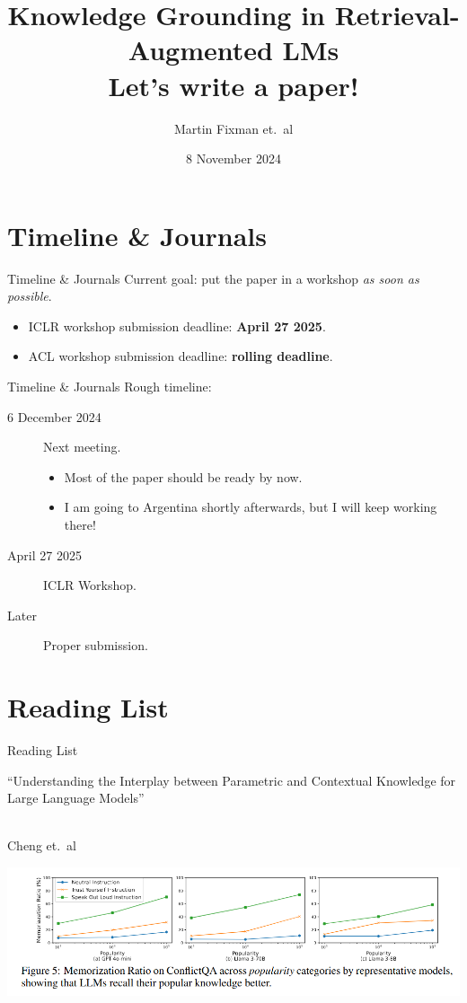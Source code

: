 \documentclass[9pt]{beamer}
\title{Knowledge Grounding in Retrieval-Augmented LMs \\ Let's write a paper!}
\author{Martin Fixman et.\ al}
\institute{City, University of London}
\date{8 November 2024}
\begin{document}
\begin{frame}
	\titlepage{}
\end{frame}

\section{Timeline \& Journals}
\begin{frame}{Timeline \& Journals}
	Current goal: put the paper in a workshop \emph{as soon as possible}.

	\begin{itemize}
		\item ICLR workshop submission deadline: \textbf{April 27 2025}.
		\item ACL workshop submission deadline: \textbf{rolling deadline}.
	\end{itemize}
\end{frame}

\begin{frame}{Timeline \& Journals}
	Rough timeline:

	\begin{description}
		\item[6 December 2024] Next meeting.
			\begin{itemize}
				\item Most of the paper should be ready by now.
				\item I am going to Argentina shortly afterwards, but I will keep working there!
			\end{itemize}
		\item[April 27 2025] ICLR Workshop.
		\item[Later] Proper submission.
	\end{description}
\end{frame}

\section{Reading List}
\begin{frame}{Reading List}
	\begin{large}
		``Understanding the Interplay between Parametric and Contextual Knowledge for Large Language Models''
	\end{large} \\
	Cheng et.\ al

	\vfill{}

	\begin{center}
		\includegraphics[width=\textwidth]{memorisation_ratio.png}
	\end{center}
\end{frame}
\end{document}
